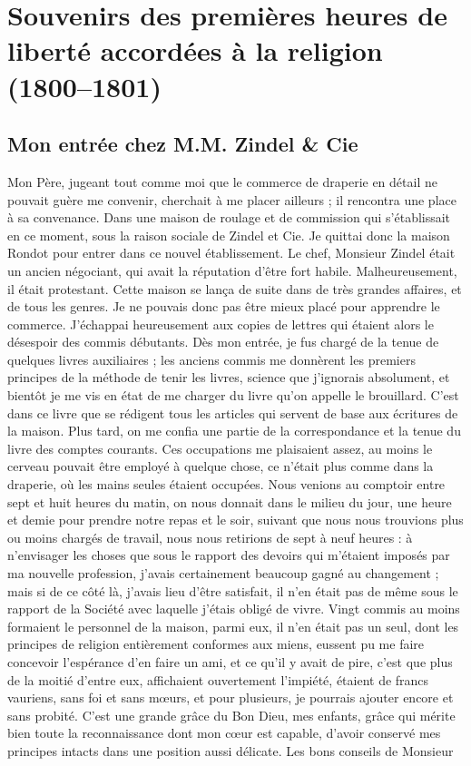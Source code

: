 \documentclass[11pt,a4paper]{report}
\begin{document}
\chapter{Souvenirs des premières heures de liberté accordées à la religion (1800--1801)}

\section*{Mon entrée chez M.M. Zindel \& Cie}

Mon Père, jugeant tout comme moi que le commerce de draperie en détail ne pouvait guère me convenir, cherchait à me placer ailleurs ; il rencontra une place à sa convenance. Dans une maison de roulage et de commission qui s'établissait en ce moment, sous la raison sociale de Zindel et Cie. Je quittai donc la maison Rondot pour entrer dans ce nouvel établissement. Le chef, Monsieur Zindel était un ancien négociant, qui avait la réputation d'être fort habile. Malheureusement, il était protestant. Cette maison se lança de suite dans de très grandes affaires, et de tous les genres. Je ne pouvais donc pas être mieux placé pour apprendre le commerce. J'échappai heureusement aux copies de lettres qui étaient alors le désespoir des commis débutants. Dès mon entrée, je fus chargé de la tenue de quelques livres auxiliaires ; les anciens commis me donnèrent les premiers principes de la méthode de tenir les livres, science que j'ignorais absolument, et bientôt je me vis en état de me charger du livre qu'on appelle le brouillard. C'est dans ce livre que se rédigent tous les articles qui servent de base aux écritures de la maison. Plus tard, on me confia une partie de la correspondance et la tenue du livre des comptes courants. Ces occupations me plaisaient assez, au moins le cerveau pouvait être employé à quelque chose, ce n'était plus comme dans la draperie, où les mains seules étaient occupées. Nous venions au comptoir entre sept et huit heures du matin, on nous donnait dans le milieu du jour, une heure et demie pour prendre notre repas et le soir, suivant que nous nous trouvions plus ou moins chargés de travail, nous nous retirions de sept à neuf heures : à n'envisager les choses que sous le rapport des devoirs qui m'étaient imposés par ma nouvelle profession, j'avais certainement beaucoup gagné au changement ; mais si de ce côté là, j'avais lieu d'être satisfait, il n'en était pas de même sous le rapport de la Société avec laquelle j'étais obligé de vivre. Vingt commis au moins formaient le personnel de la maison, parmi eux, il n'en était pas un seul, dont les principes de religion entièrement conformes aux miens, eussent pu me faire concevoir l'espérance d'en faire un ami, et ce qu'il y avait de pire, c'est que plus de la moitié d'entre eux, affichaient ouvertement l'impiété, étaient de francs vauriens, sans foi et sans mœurs, et pour plusieurs, je pourrais ajouter encore et sans probité. C'est une grande grâce du Bon Dieu, mes enfants, grâce qui mérite bien toute la reconnaissance dont mon cœur est capable, d'avoir conservé mes principes intacts dans une position aussi délicate. Les bons conseils de Monsieur 
\end{document}
